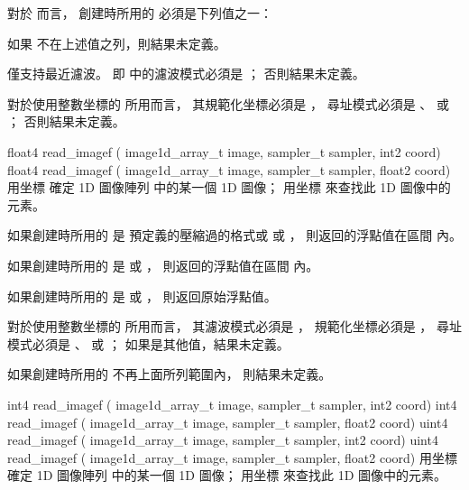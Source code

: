 對於  而言，
創建時所用的  必須是下列值之一：
\startigBase[indentnext=no]
\item {}
\item {}
\item {}
\stopigBase
如果  不在上述值之列，則結果未定義。

 僅支持最近濾波。
即  中的濾波模式必須是 ；
否則結果未定義。

對於使用整數坐標的  所用而言，
其規範化坐標必須是 ，
尋址模式必須是 、 
 或 ；
否則結果未定義。
\stopbuffer

float4 read_imagef (
	image1d_array_t image,
	sampler_t sampler,
	int2 coord)
float4 read_imagef (
	image1d_array_t image,
	sampler_t sampler,
	float2 coord)
\stopbuffer
{}
用坐標  確定 1D 圖像陣列  中的某一個 1D 圖像；
用坐標  來查找此 1D 圖像中的元素。

如果創建時所用的  是
預定義的壓縮過的格式或  或 ，
則返回的浮點值在區間 \math{[0.0 \cdots 1.0]} 內。

如果創建時所用的  是
  或 ，
則返回的浮點值在區間 \math{[-1.0 \cdots 1.0]} 內。

如果創建時所用的  是
  或 ，
則返回原始浮點值。

對於使用整數坐標的  所用而言，
其濾波模式必須是 ，
規範化坐標必須是 ，
尋址模式必須是 、 
 或 ；
如果是其他值，結果未定義。

如果創建時所用的  不再上面所列範圍內，
則結果未定義。
\stopbuffer

int4 read_imagef (
	image1d_array_t image,
	sampler_t sampler,
	int2 coord)
int4 read_imagef (
	image1d_array_t image,
	sampler_t sampler,
	float2 coord)
uint4 read_imagef (
	image1d_array_t image,
	sampler_t sampler,
	int2 coord)
uint4 read_imagef (
	image1d_array_t image,
	sampler_t sampler,
	float2 coord)
\stopbuffer
{}
用坐標  確定 1D 圖像陣列  中的某一個 1D 圖像；
用坐標  來查找此 1D 圖像中的元素。

